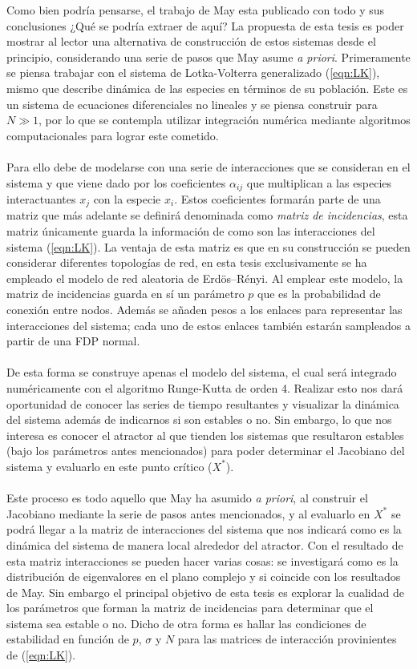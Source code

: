 Como bien podría pensarse, el trabajo de May esta publicado con todo y sus conclusiones ¿Qué se podría extraer de aquí? La propuesta de esta tesis es poder mostrar al lector una alternativa de construcción de estos sistemas desde el principio, considerando una serie de pasos que May asume \textit{a priori}. Primeramente se piensa trabajar con el sistema de Lotka-Volterra generalizado (\ref{eqn:LK}), mismo que describe dinámica de las especies en términos de su población. Este es un sistema de ecuaciones diferenciales no lineales y se piensa construir para $N\gg 1$, por lo que se contempla utilizar integración numérica mediante algoritmos computacionales para lograr este cometido. \\
\\
Para ello debe de modelarse con una serie de interacciones que se consideran en el sistema y que viene dado por los coeficientes $\alpha_{ij}$ que multiplican a las especies interactuantes $x_j$ con la especie $x_i$. Estos coeficientes formarán parte de una matriz que más adelante se definirá denominada como \textit{matriz de incidencias}, esta matriz únicamente guarda la información de como son las interacciones del sistema (\ref{eqn:LK}). La ventaja de esta matriz es que en su construcción se pueden considerar diferentes topologías de red, en esta tesis exclusivamente se ha empleado el modelo de red aleatoria de Erdös–Rényi. Al emplear este modelo, la matriz de incidencias guarda en sí un parámetro $p$ que es la probabilidad de conexión entre nodos. Además se añaden pesos a los enlaces para representar las interacciones del sistema; cada uno de estos enlaces también estarán sampleados a partir de una FDP normal.\\
\\
De esta forma se construye apenas el modelo del sistema, el cual será integrado numéricamente con el algoritmo Runge-Kutta de orden 4. Realizar esto nos dará oportunidad de conocer las series de tiempo resultantes y visualizar la dinámica del sistema además de indicarnos si son estables o no. Sin embargo, lo que nos interesa es conocer el atractor al que tienden los sistemas que resultaron estables (bajo los parámetros antes mencionados) para poder determinar el Jacobiano del sistema y evaluarlo en este punto crítico ($X^*$). \\
\\
Este proceso es todo aquello que May ha asumido \textit{a priori}, al construir el Jacobiano mediante la serie de pasos antes mencionados, y al evaluarlo en $X^*$ se podrá llegar a la matriz de interacciones del sistema que nos indicará como es la dinámica del sistema de manera local alrededor del atractor. Con el resultado de esta matriz interacciones se pueden hacer varias cosas: se investigará como es la distribución de eigenvalores en el plano complejo y si coincide con los resultados de May. Sin embargo el principal objetivo de esta tesis es explorar la cualidad de los parámetros que forman la matriz de incidencias para determinar que el sistema sea estable o no. Dicho de otra forma es hallar las condiciones de estabilidad en función de $p$, $\sigma$ y $N$  para las matrices de interacción provinientes de (\ref{eqn:LK}).\\
